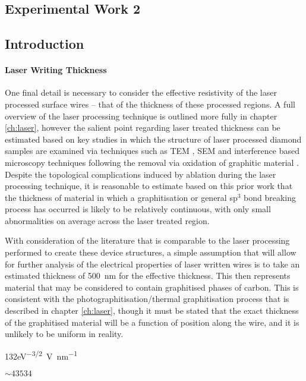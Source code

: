 \begin{refsection}
\chapter{Experimental Work 2} %
\section{Introduction}
\subsubsection{Laser Writing Thickness}
\label{subsubsec:laser_writing_thickness}
One final detail is necessary to consider the effective resistivity of the laser processed surface wires -- that of the thickness of these processed regions. A full overview of the laser processing technique is outlined more fully in chapter \ref{ch:laser}, however the salient point regarding laser treated thickness can be estimated based on key studies in which the structure of laser processed diamond samples are examined via techniques such as TEM \cite{salter2017}, SEM \cite{ashikkalieva2022} and interference based microscopy techniques following the removal via oxidation of graphitic material \cite{kononenko2005}. Despite the topological complications induced by ablation during the laser processing technique, it is reasonable to estimate based on this prior work that the thickness of material in which a graphitisation or general sp$^{3}$ bond breaking process has occurred is likely to be relatively continuous, with only small abnormalities on average across the laser treated region. 

With consideration of the literature that is comparable to the laser processing performed to create these device structures, a simple assumption that will allow for further analysis of the electrical properties of laser written wires is to take an estimated thickness of 500~\si{\nano\metre} for the effective thickness. This then represents material that may be considered to contain graphitised phases of carbon. This is consistent with the photographitisation/thermal graphitisation process that is described in chapter \ref{ch:laser}, though it must be stated that the exact thickness of the graphitised material will be a function of position along the wire, and it is unlikely to be uniform in reality. 

132\si{\electronvolt^{-3/2}\volt\per\nano\metre}

$\sim43534$


\printbibliography[heading=subbibliography]
\end{refsection}

